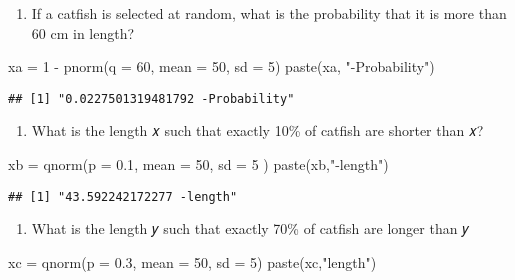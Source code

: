 \documentclass[
]{article}
\newenvironment{Shaded}{\begin{snugshade}}{\end{snugshade}}
\newcommand{\AttributeTok}[1]{\textcolor[rgb]{0.77,0.63,0.00}{#1}}
\newcommand{\DecValTok}[1]{\textcolor[rgb]{0.00,0.00,0.81}{#1}}
\newcommand{\FloatTok}[1]{\textcolor[rgb]{0.00,0.00,0.81}{#1}}
\newcommand{\FunctionTok}[1]{\textcolor[rgb]{0.00,0.00,0.00}{#1}}
\newcommand{\NormalTok}[1]{#1}
\newcommand{\OtherTok}[1]{\textcolor[rgb]{0.56,0.35,0.01}{#1}}
\newcommand{\SpecialCharTok}[1]{\textcolor[rgb]{0.00,0.00,0.00}{#1}}
\newcommand{\StringTok}[1]{\textcolor[rgb]{0.31,0.60,0.02}{#1}}
\providecommand{\tightlist}{%
  \setlength{\itemsep}{0pt}\setlength{\parskip}{0pt}}
\begin{document}
\begin{enumerate}
\def\labelenumi{\alph{enumi}.}
\tightlist
\item
  If a catfish is selected at random, what is the probability that it is
  more than 60 cm in length?
\end{enumerate}

\begin{Shaded}
\begin{Highlighting}[]
\NormalTok{xa }\OtherTok{=} \DecValTok{1} \SpecialCharTok{{-}} \FunctionTok{pnorm}\NormalTok{(}\AttributeTok{q =} \DecValTok{60}\NormalTok{, }\AttributeTok{mean =} \DecValTok{50}\NormalTok{, }\AttributeTok{sd =} \DecValTok{5}\NormalTok{)}
\FunctionTok{paste}\NormalTok{(xa, }\StringTok{"{-}Probability"}\NormalTok{)}
\end{Highlighting}
\end{Shaded}

\begin{verbatim}
## [1] "0.0227501319481792 -Probability"
\end{verbatim}

\begin{enumerate}
\def\labelenumi{\alph{enumi}.}
\setcounter{enumi}{1}
\tightlist
\item
  What is the length 𝑥 such that exactly 10\% of catfish are shorter
  than 𝑥?
\end{enumerate}

\begin{Shaded}
\begin{Highlighting}[]
\NormalTok{xb }\OtherTok{=} \FunctionTok{qnorm}\NormalTok{(}\AttributeTok{p =} \FloatTok{0.1}\NormalTok{, }\AttributeTok{mean =} \DecValTok{50}\NormalTok{, }\AttributeTok{sd =} \DecValTok{5}\NormalTok{ )}
\FunctionTok{paste}\NormalTok{(xb,}\StringTok{"{-}length"}\NormalTok{)}
\end{Highlighting}
\end{Shaded}

\begin{verbatim}
## [1] "43.592242172277 -length"
\end{verbatim}

\begin{enumerate}
\def\labelenumi{\alph{enumi}.}
\setcounter{enumi}{2}
\tightlist
\item
  What is the length 𝑦 such that exactly 70\% of catfish are longer than
  𝑦
\end{enumerate}

\begin{Shaded}
\begin{Highlighting}[]
\NormalTok{xc }\OtherTok{=} \FunctionTok{qnorm}\NormalTok{(}\AttributeTok{p =} \FloatTok{0.3}\NormalTok{, }\AttributeTok{mean =} \DecValTok{50}\NormalTok{, }\AttributeTok{sd =} \DecValTok{5}\NormalTok{)}
\FunctionTok{paste}\NormalTok{(xc,}\StringTok{"length"}\NormalTok{)}
\end{Highlighting}
\end{Shaded}
\end{document}
